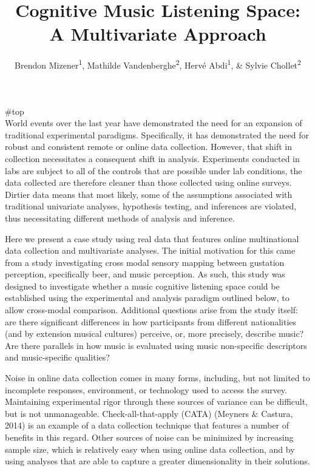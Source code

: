\documentclass[
  english,
  man,floatsintext]{apa6}
\title{Cognitive Music Listening Space: A Multivariate Approach}
\author{Brendon Mizener\textsuperscript{1}, Mathilde Vandenberghe\textsuperscript{2}, Hervé Abdi\textsuperscript{1}, \& Sylvie Chollet\textsuperscript{2}}
\date{}
\affiliation{\vspace{0.5cm}\textsuperscript{1} University of Texas at Dallas\\\textsuperscript{2} YNCREA}
\begin{document}
\maketitle

\#top\\
World events over the last year have demonstrated the need for an expansion of traditional experimental paradigms. Specifically, it has demonstrated the need for robust and consistent remote or online data collection. However, that shift in collection necessitates a consequent shift in analysis. Experiments conducted in labs are subject to all of the controls that are possible under lab conditions, the data collected are therefore cleaner than those collected using online surveys. Dirtier data means that most likely, some of the assumptions associated with traditional univariate analyses, hypothesis testing, and inferences are violated, thus necessitating different methods of analysis and inference.

Here we present a case study using real data that features online multinational data collection and multivariate analyses. The initial motivation for this came from a study investigating cross modal sensory mapping between gustation perception, specifically beer, and music perception. As such, this study was designed to investigate whether a music cognitive listening space could be established using the experimental and analysis paradigm outlined below, to allow cross-modal comparison. Additional questions arise from the study itself: are there significant differences in how participants from different nationalities (and by extension musical cultures) perceive, or, more precisely, describe music? Are there parallels in how music is evaluated using music non-specific descriptors and music-specific qualities?

Noise in online data collection comes in many forms, including, but not limited to incomplete responses, environment, or technology used to access the survey. Maintaining experimental rigor through these sources of variance can be difficult, but is not unmanageable. Check-all-that-apply (CATA) (Meyners \& Castura, 2014) is an example of a data collection technique that features a number of benefits in this regard. Other sources of noise can be minimized by increasing sample size, which is relatively easy when using online data collection, and by using analyses that are able to capture a greater dimensionality in their solutions.
\end{document}
